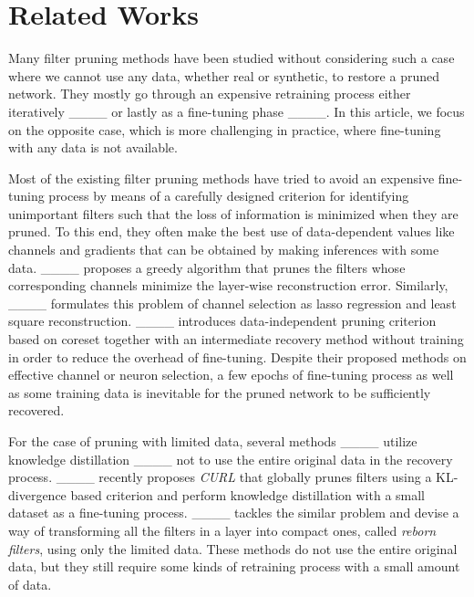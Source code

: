 \section{Related Works}
\label{sec:related}
Many filter pruning methods have been studied without considering such a case where we cannot use any data, whether real or synthetic, to restore a pruned network. They mostly go through an expensive retraining process either iteratively ____ or lastly as a fine-tuning phase ____. In this article, we focus on the opposite case, which is more challenging in practice, where fine-tuning with any data is not available.

Most of the existing filter pruning methods have tried to avoid an expensive fine-tuning process by means of a carefully designed criterion for identifying unimportant filters such that the loss of information is minimized when they are pruned. To this end, they often make the best use of data-dependent values like channels and gradients that can be obtained by making inferences with some data. ____ proposes a greedy algorithm that prunes the filters whose corresponding channels minimize the layer-wise reconstruction error. Similarly, ____ formulates this problem of channel selection as lasso regression and least square reconstruction.  ____ introduces data-independent pruning criterion based on coreset together with an intermediate recovery method without training in order to reduce the overhead of fine-tuning. Despite their proposed methods on effective channel or neuron selection, a few epochs of fine-tuning process as well as some training data is inevitable for the pruned network to be sufficiently recovered. 


For the case of pruning with limited data, several methods ____ utilize knowledge distillation ____ not to use the entire original data in the recovery process. ____ recently proposes \textit{CURL} that globally prunes filters using a KL-divergence based criterion and perform knowledge distillation with a small dataset as a fine-tuning process. ____ tackles the similar problem and devise a way of transforming all the filters in a layer into compact ones, called \textit{reborn filters}, using only the limited data. These methods do not use the entire original data, but they still require some kinds of retraining process with a small amount of data. 


